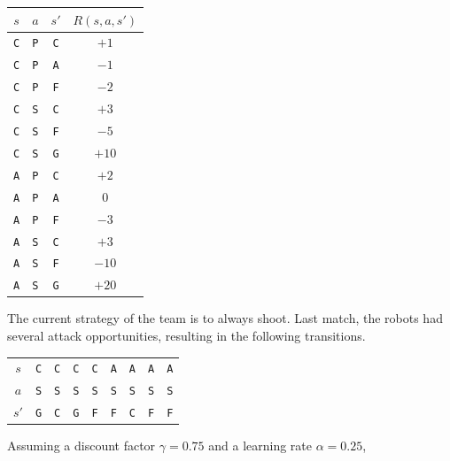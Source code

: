 \documentclass[11pt, a4paper]{exam}
\newcommand*{\C}{\texttt{C}}
\newcommand*{\A}{\texttt{A}}
\newcommand*{\F}{\texttt{F}}
\newcommand*{\G}{\texttt{G}}
\renewcommand*{\P}{\texttt{P}}
\renewcommand*{\S}{\texttt{S}}
\begin{document}
\begin{exercises}
\begin{center}
    \begin{tabular}{cccc}
        \toprule
        $s$ & $a$ & $s'$ & $R(s, a, s')$ \\
        \midrule
        \C & \P & \C & $+1$ \\
        \C & \P & \A & $-1$ \\
        \C & \P & \F & $-2$ \\
        \C & \S & \C & $+3$ \\
        \C & \S & \F & $-5$ \\
        \C & \S & \G & $+10$ \\
        \midrule
        \A & \P & \C & $+2$ \\
        \A & \P & \A & $0$ \\
        \A & \P & \F & $-3$ \\
        \A & \S & \C & $+3$ \\
        \A & \S & \F & $-10$ \\
        \A & \S & \G & $+20$ \\
        \bottomrule
    \end{tabular}
\end{center}

The current strategy of the team is to always shoot. Last match, the robots had several attack opportunities, resulting in the following transitions.

\begin{center}
    \begin{tabular}{ccccccccc}
        \toprule
        $s$ & \C & \C & \C & \C & \A & \A & \A & \A \\
        $a$ & \S & \S & \S & \S & \S & \S & \S & \S \\
        $s'$ & \G & \C & \G & \F & \F & \C & \F & \F \\
        \bottomrule
    \end{tabular}
\end{center}

Assuming a discount factor $\gamma = 0.75$ and a learning rate $\alpha = 0.25$,

\end{exercises}
\end{document}
